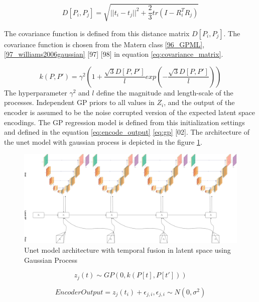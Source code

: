     \begin{equation}
     D[P_i, P_j] = \sqrt{{||t_i - t_j||}^2 + \frac{2}{3} tr(I - R_i^TR_j)}
     \label{eq:distance_matrix}    
    \end{equation}
	
	The covariance function is defined from this distance matrix $D[P_i, P_j]$. The covariance function is chosen from the Matern class \ref{96_GPML}, \ref{97_williams2006gaussian} [97] [98] in equation \ref{eq:covariance_matrix}.  
	
	\begin{equation}
		k(P,P') = \gamma^2(1+\frac{\sqrt{3}D[P,P']}{l}exp(-\frac{\sqrt{3}D[P,P']}{l}))
		\label{eq:covariance_matrix}
	\end{equation}
	The hyperparameter $\gamma^2$ and $l$ define the magnitude and length-scale of the processes. Independent GP priors to all values in $Z_i$, and the output of the encoder is assumed to be the noise corrupted version of the expected latent space encodings. The GP regression model is defined from this initialization settings and defined in the equation \ref{eq:encode_output} \ref{eq:gp} [02]. The architecture of the unet model with gaussian process is depicted in the figure \ref{fig:unet_gp}.

	\begin{figure}[h]
		\centering
		\includegraphics[width=14cm]{images/unet_gp.png}
		\caption{Unet model architecture with temporal fusion in latent space using Gaussian Process}
		\label{fig:unet_gp}
	\end{figure}

	\begin{equation}
		z_j(t) \sim GP(0, k(P[t], P[t']))
		\label{eq:gp}
	\end{equation}
	
	\begin{equation}
		EncoderOutput = z_j(t_i)+ \epsilon_{j,i}, \epsilon_{j,i} \sim  N(0, \sigma^2)
		\label{eq:encode_output}
	\end{equation}
    
